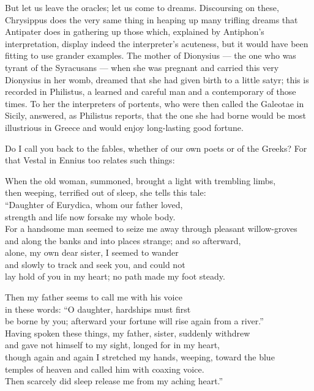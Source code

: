  But let us leave the oracles; let us come to dreams. Discoursing on these, Chrysippus does the very same thing in heaping up many trifling dreams that Antipater does in gathering up those which, explained by Antiphon's interpretation, display indeed the interpreter's acuteness, but it would have been fitting to use grander examples. The mother of Dionysius — the one who was tyrant of the Syracusans — when she was pregnant and carried this very Dionysius in her womb, dreamed that she had given birth to a little satyr; this is recorded in Philistus, a learned and careful man and a contemporary of those times. To her the interpreters of portents, who were then called the Galeotae in Sicily, answered, as Philistus reports, that the one she had borne would be most illustrious in Greece and would enjoy long-lasting good fortune.

 Do I call you back to the fables, whether of our own poets or of the Greeks? For that Vestal in Ennius too relates such things:

When the old woman, summoned, brought a light with trembling limbs, \\
then weeping, terrified out of sleep, she tells this tale: \\
``Daughter of Eurydica, whom our father loved, \\
strength and life now forsake my whole body. \\
For a handsome man seemed to seize me away through pleasant willow-groves \\
and along the banks and into places strange; and so afterward, \\
alone, my own dear sister, I seemed to wander \\
and slowly to track and seek you, and could not \\
lay hold of you in my heart; no path made my foot steady.

 Then my father seems to call me with his voice \\
in these words: ``O daughter, hardships must first \\
be borne by you; afterward your fortune will rise again from a river.'' \\
Having spoken these things, my father, sister, suddenly withdrew \\
and gave not himself to my sight, longed for in my heart, \\
though again and again I stretched my hands, weeping, toward the blue \\
temples of heaven and called him with coaxing voice. \\
Then scarcely did sleep release me from my aching heart.''

